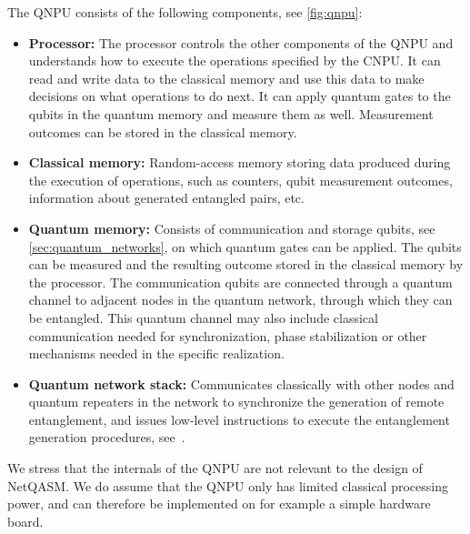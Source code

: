 The \ac{QNPU} consists of the following components, see \cref{fig:qnpu}:
\begin{itemize}
    \item \textbf{Processor:}
            The processor controls the other components of the \ac{QNPU} and understands how to execute the operations specified by the \ac{CNPU}.
            It can read and write data to the classical memory and use this data to make decisions on what operations to do next.
            It can apply quantum gates to the qubits in the quantum memory and measure them as well.
            Measurement outcomes can be stored in the classical memory.
    \item \textbf{Classical memory:}
            Random-access memory storing data produced during the execution of operations, such as counters, qubit measurement outcomes, information about generated entangled pairs, etc.
    \item \textbf{Quantum memory:}
            Consists of communication and storage qubits, see \cref{sec:quantum_networks}, on which quantum gates can be applied.
            The qubits can be measured and the resulting outcome stored in the classical memory by the processor.
            The communication qubits are connected through a quantum channel to adjacent nodes in the quantum network, through which they can be entangled.
            This quantum channel may also include classical communication needed for synchronization, phase stabilization or other mechanisms needed in the specific realization.
    \item \textbf{Quantum network stack:}
            Communicates classically with other nodes and quantum repeaters in the network to synchronize the generation of remote entanglement, and issues low-level instructions to execute the entanglement generation procedures, see~\cite{dahlberg2019linklayer,kozlowski2020networklayer}.
\end{itemize}

We stress that the internals of the \ac{QNPU} are not relevant to the design of \ac{NetQASM}.
We do assume that the \ac{QNPU} only has limited classical processing power, and can therefore be implemented on for example a simple hardware board.





